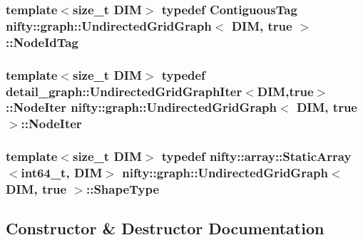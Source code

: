 \subsubsection[{Node\+Id\+Tag}]{\setlength{\rightskip}{0pt plus 5cm}template$<$size\+\_\+t D\+I\+M$>$ typedef {\bf Contiguous\+Tag} {\bf nifty\+::graph\+::\+Undirected\+Grid\+Graph}$<$ D\+I\+M, true $>$\+::{\bf Node\+Id\+Tag}}\label{classnifty_1_1graph_1_1UndirectedGridGraph_3_01DIM_00_01true_01_4_a35ae15ae07ebf58ef26916b417fba878}
\hypertarget{classnifty_1_1graph_1_1UndirectedGridGraph_3_01DIM_00_01true_01_4_a977e01bd675cc7d454ce18417c6e0397}{}
\subsubsection[{Node\+Iter}]{\setlength{\rightskip}{0pt plus 5cm}template$<$size\+\_\+t D\+I\+M$>$ typedef {\bf detail\+\_\+graph\+::\+Undirected\+Grid\+Graph\+Iter}$<$D\+I\+M,true$>$\+::{\bf Node\+Iter} {\bf nifty\+::graph\+::\+Undirected\+Grid\+Graph}$<$ D\+I\+M, true $>$\+::{\bf Node\+Iter}}\label{classnifty_1_1graph_1_1UndirectedGridGraph_3_01DIM_00_01true_01_4_a977e01bd675cc7d454ce18417c6e0397}
\hypertarget{classnifty_1_1graph_1_1UndirectedGridGraph_3_01DIM_00_01true_01_4_abea92f7d305119d361e2189b00e495ba}{}
\subsubsection[{Shape\+Type}]{\setlength{\rightskip}{0pt plus 5cm}template$<$size\+\_\+t D\+I\+M$>$ typedef {\bf nifty\+::array\+::\+Static\+Array}$<$int64\+\_\+t, D\+I\+M$>$ {\bf nifty\+::graph\+::\+Undirected\+Grid\+Graph}$<$ D\+I\+M, true $>$\+::{\bf Shape\+Type}}\label{classnifty_1_1graph_1_1UndirectedGridGraph_3_01DIM_00_01true_01_4_abea92f7d305119d361e2189b00e495ba}


\subsection{Constructor \& Destructor Documentation}
\hypertarget{classnifty_1_1graph_1_1UndirectedGridGraph_3_01DIM_00_01true_01_4_ae07e559f9d33b543c69a6466bbc10348}{}
